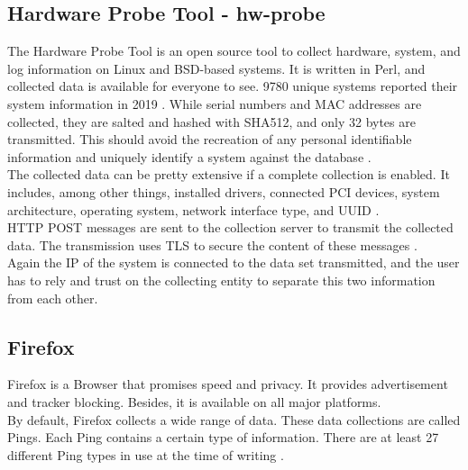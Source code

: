     \subsection{Hardware Probe Tool - hw-probe}
        The Hardware Probe Tool is an open source tool to collect hardware, system, and log information on Linux and BSD-based systems. It is written in Perl, and collected data is available for everyone to see. 9780 unique systems reported their system information in 2019 \cite{ponomarenko_linux_nodate}.
        While serial numbers and MAC addresses are collected, they are salted and hashed with SHA512, and only 32 bytes are transmitted. 
        This should avoid the recreation of any personal identifiable information and uniquely identify a system against the database  \cite{project_linuxhwhw-probe_2020}.\\
        The collected data can be pretty extensive if a complete collection is enabled. It includes, among other things, installed drivers, connected PCI devices, system architecture, operating system, network interface type, and UUID \cite{project_linuxhwhw-probe_2020}.\\
        
        HTTP POST messages are sent to the collection server to transmit the collected data. The transmission uses TLS to secure the content of these messages \cite{project_linuxhwhw-probe_2020}.\\
        Again the IP of the system is connected to the data set transmitted, and the user has to rely and trust on the collecting entity to separate this two information from each other.\\
    


\newpage
    \subsection{Firefox}
        Firefox is a Browser that promises speed and privacy. It provides advertisement and tracker blocking. Besides, it is available on all major platforms.\\ 
        By default, Firefox collects a wide range of data. These data collections are called Pings. Each Ping contains a certain type of information. There are at least 27 different Ping types in use at the time of writing \cite{mozilla_telemetry_nodate}.
        
